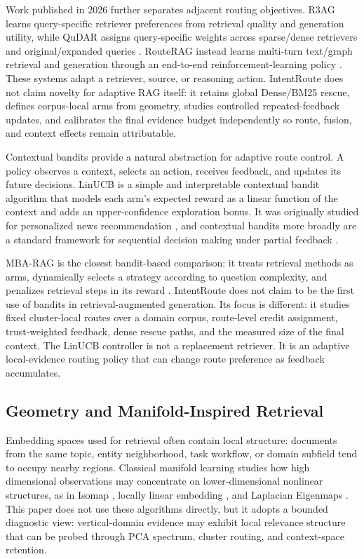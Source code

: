 Work published in 2026 further separates adjacent routing objectives. R3AG learns query-specific retriever preferences from retrieval quality and generation utility, while QuDAR assigns query-specific weights across sparse/dense retrievers and original/expanded queries \citep{zhao2026r3ag,kim2026qudar}. RouteRAG instead learns multi-turn text/graph retrieval and generation through an end-to-end reinforcement-learning policy \citep{guo2026routerag}. These systems adapt a retriever, source, or reasoning action. IntentRoute does not claim novelty for adaptive RAG itself: it retains global Dense/BM25 rescue, defines corpus-local arms from geometry, studies controlled repeated-feedback updates, and calibrates the final evidence budget independently so route, fusion, and context effects remain attributable.

Contextual bandits provide a natural abstraction for adaptive route control. A policy observes a context, selects an action, receives feedback, and updates its future decisions. LinUCB is a simple and interpretable contextual bandit algorithm that models each arm's expected reward as a linear function of the context and adds an upper-confidence exploration bonus. It was originally studied for personalized news recommendation \citep{li2010linucb}, and contextual bandits more broadly are a standard framework for sequential decision making under partial feedback \citep{lattimore2020bandits}.

MBA-RAG is the closest bandit-based comparison: it treats retrieval methods as arms, dynamically selects a strategy according to question complexity, and penalizes retrieval steps in its reward \citep{tang2025mbarag}. IntentRoute does not claim to be the first use of bandits in retrieval-augmented generation. Its focus is different: it studies fixed cluster-local routes over a domain corpus, route-level credit assignment, trust-weighted feedback, dense rescue paths, and the measured size of the final context. The LinUCB controller is not a replacement retriever. It is an adaptive local-evidence routing policy that can change route preference as feedback accumulates.

\subsection{Geometry and Manifold-Inspired Retrieval}
\label{sec:03-related-work:geometry-and-manifold-inspired-retrieval}

Embedding spaces used for retrieval often contain local structure: documents from the same topic, entity neighborhood, task workflow, or domain subfield tend to occupy nearby regions. Classical manifold learning studies how high dimensional observations may concentrate on lower-dimensional nonlinear structures, as in Isomap \citep{tenenbaum2000isomap}, locally linear embedding \citep{roweis2000lle}, and Laplacian Eigenmaps \citep{belkin2003laplacian}. This paper does not use these algorithms directly, but it adopts a bounded diagnostic view: vertical-domain evidence may exhibit local relevance structure that can be probed through PCA spectrum, cluster routing, and context-space retention.

